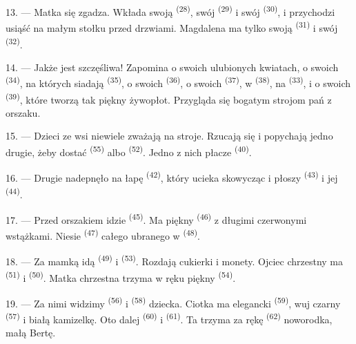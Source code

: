 13. --- Matka się zgadza. Wkłada swoją  \textsuperscript{(28)}, swój
 \textsuperscript{(29)} i swój  \textsuperscript{(30)}, i
przychodzi usiąść na małym stołku przed drzwiami. Magdalena ma tylko swoją
 \textsuperscript{(31)} i swój  \textsuperscript{(32)}.

14. --- Jakże jest szczęśliwa! Zapomina o swoich ulubionych kwiatach, o swoich
 \textsuperscript{(34)}, na których siadają 
\textsuperscript{(35)}, o swoich  \textsuperscript{(36)}, o swoich
 \textsuperscript{(37)}, w  \textsuperscript{(38)},
na  \textsuperscript{(33)}, i o swoich 
\textsuperscript{(39)}, które tworzą tak piękny żywopłot. Przygląda się bogatym strojom
pań z orszaku.

15. --- Dzieci ze wsi niewiele zważają na stroje. Rzucają się i popychają jedno drugie,
żeby dostać  \textsuperscript{(55)} albo 
\textsuperscript{(52)}. Jedno z nich płacze \textsuperscript{(40)}.

16. --- Drugie nadepnęło na łapę  \textsuperscript{(42)}, który ucieka
skowycząc i płoszy  \textsuperscript{(43)} i jej 
\textsuperscript{(44)}.

\VUsaut{5.0mm}
\VUsaut{4.0mm}

17. --- Przed orszakiem idzie  \textsuperscript{(45)}. Ma piękny
 \textsuperscript{(46)} z długimi czerwonymi wstążkami. Niesie
 \textsuperscript{(47)} całego ubranego w 
\textsuperscript{(48)}.

18. --- Za mamką idą  \textsuperscript{(49)} i  \textsuperscript{(53)}. Rozdają cukierki i monety. Ojciec chrzestny ma
 \textsuperscript{(51)} i  \textsuperscript{(50)}.
Matka chrzestna trzyma w ręku piękny  \textsuperscript{(54)}.

19. --- Za nimi widzimy  \textsuperscript{(56)} i 
\textsuperscript{(58)} dziecka. Ciotka ma elegancki 
\textsuperscript{(59)}, wuj czarny  \textsuperscript{(57)} i białą
kamizelkę. Oto dalej  \textsuperscript{(60)} i 
\textsuperscript{(61)}. Ta trzyma za rękę  \textsuperscript{(62)}
noworodka, małą Bertę.

